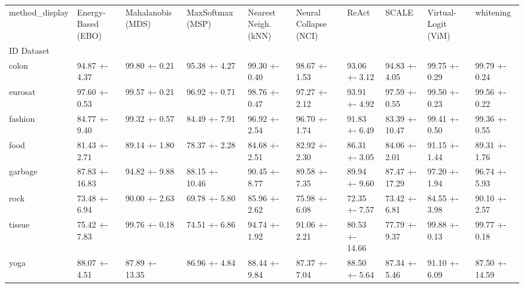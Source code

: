 \begin{tabular}{llllllllll}
\toprule
method_display & Energy-Based (EBO) & Mahalanobis (MDS) & MaxSoftmax (MSP) & Nearest Neigh. (kNN) & Neural Collapse (NCI) & ReAct & SCALE & Virtual-Logit (ViM) & whitening \\
ID Dataset &  &  &  &  &  &  &  &  &  \\
\midrule
colon & 94.87 +- 4.37 & 99.80 +- 0.21 & 95.38 +- 4.27 & 99.30 +- 0.40 & 98.67 +- 1.53 & 93.06 +- 3.12 & 94.83 +- 4.05 & 99.75 +- 0.29 & 99.79 +- 0.24 \\
eurosat & 97.60 +- 0.53 & 99.57 +- 0.21 & 96.92 +- 0.71 & 98.76 +- 0.47 & 97.27 +- 2.12 & 93.91 +- 4.92 & 97.59 +- 0.55 & 99.50 +- 0.23 & 99.56 +- 0.22 \\
fashion & 84.77 +- 9.40 & 99.32 +- 0.57 & 84.49 +- 7.91 & 96.92 +- 2.54 & 96.70 +- 1.74 & 91.83 +- 6.49 & 83.39 +- 10.47 & 99.41 +- 0.50 & 99.36 +- 0.55 \\
food & 81.43 +- 2.71 & 89.14 +- 1.80 & 78.37 +- 2.28 & 84.68 +- 2.51 & 82.92 +- 2.30 & 86.31 +- 3.05 & 84.06 +- 2.01 & 91.15 +- 1.44 & 89.31 +- 1.76 \\
garbage & 87.83 +- 16.83 & 94.82 +- 9.88 & 88.15 +- 10.46 & 90.45 +- 8.77 & 89.58 +- 7.35 & 89.94 +- 9.60 & 87.47 +- 17.29 & 97.20 +- 1.94 & 96.74 +- 5.93 \\
rock & 73.48 +- 6.94 & 90.00 +- 2.63 & 69.78 +- 5.80 & 85.96 +- 2.62 & 75.98 +- 6.08 & 72.35 +- 7.57 & 73.42 +- 6.81 & 84.55 +- 3.98 & 90.10 +- 2.57 \\
tissue & 75.42 +- 7.83 & 99.76 +- 0.18 & 74.51 +- 6.86 & 94.74 +- 1.92 & 91.06 +- 2.21 & 80.53 +- 14.66 & 77.79 +- 9.37 & 99.88 +- 0.13 & 99.77 +- 0.18 \\
yoga & 88.07 +- 4.51 & 87.89 +- 13.35 & 86.96 +- 4.84 & 88.44 +- 9.84 & 87.37 +- 7.04 & 88.50 +- 5.64 & 87.34 +- 5.46 & 91.10 +- 6.09 & 87.50 +- 14.59 \\
\bottomrule
\end{tabular}
